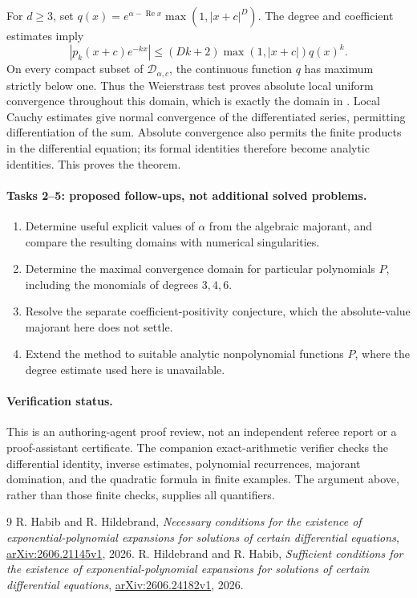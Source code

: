 \documentclass[11pt]{article}
\begin{document}
For $d\geq3$, set
$q(x)=e^{\alpha-\operatorname{Re}x}\max(1,|x+c|^D)$.
The degree and coefficient estimates imply
\[
 |p_k(x+c)e^{-kx}|
 \leq(Dk+2)\max(1,|x+c|)q(x)^k.
\]
On every compact subset of $\mathcal D_{\alpha,c}$, the continuous
function $q$ has maximum strictly below one. Thus the Weierstrass
test proves absolute local uniform convergence throughout this domain,
which is exactly the domain in \cite[Lemma 6.1]{necessary}.
Local Cauchy estimates give normal convergence of the differentiated
series, permitting differentiation of the sum. Absolute convergence also permits the
finite products in the differential equation; its formal identities
therefore become analytic identities. This proves the theorem.

\paragraph{Tasks 2--5: proposed follow-ups, not additional solved problems.}
\begin{enumerate}
 \item Determine useful explicit values of $\alpha$ from the algebraic
 majorant, and compare the resulting domains with numerical singularities.
 \item Determine the maximal convergence domain for particular polynomials
 $P$, including the monomials of degrees $3,4,6$.
 \item Resolve the separate coefficient-positivity conjecture, which the
 absolute-value majorant here does not settle.
 \item Extend the method to suitable analytic nonpolynomial functions $P$,
 where the degree estimate used here is unavailable.
\end{enumerate}

\paragraph{Verification status.}
This is an authoring-agent proof review, not an independent referee report
or a proof-assistant certificate. The companion exact-arithmetic verifier
checks the differential identity, inverse estimates, polynomial recurrences,
majorant domination, and the quadratic formula in finite examples.
The argument above, rather than those finite checks, supplies all quantifiers.

\begin{thebibliography}{9}
 R. Habib and R. Hildebrand,
\emph{Necessary conditions for the existence of exponential-polynomial
expansions for solutions of certain differential equations},
\href{https://arxiv.org/abs/2606.21145v1}{arXiv:2606.21145v1}, 2026.
 R. Hildebrand and R. Habib,
\emph{Sufficient conditions for the existence of exponential-polynomial
expansions for solutions of certain differential equations},
\href{https://arxiv.org/abs/2606.24182v1}{arXiv:2606.24182v1}, 2026.
\end{thebibliography}
\end{document}

